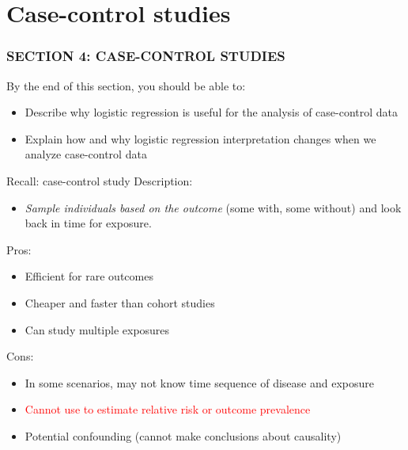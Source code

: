 \documentclass[10pt,t]{beamer}
\begin{document}
\section{Case-control studies}
\begin{frame}
	\frametitle{SECTION 4: CASE-CONTROL STUDIES}
	By the end of this section, you should be able to:
	\begin{itemize}
		\item Describe why logistic regression is useful for the analysis of case-control data
		\item Explain how and why logistic regression interpretation changes when we analyze case-control data
	\end{itemize}
\end{frame}

\begin{frame}{Recall: case-control study}
	Description:
	\begin{itemize}
		\item \textit{Sample individuals based on the outcome} (some with, some without) and look back in time for exposure. 
	\end{itemize}\pause
	Pros:\pause
	\begin{itemize}
		\item Efficient for rare outcomes\pause
		\item Cheaper and faster than cohort studies\pause
		\item Can study multiple exposures\pause
	\end{itemize}
	
	Cons:\pause
	\begin{itemize}
		\item In some scenarios, may not know time sequence of disease and exposure\pause
		\item \textcolor{red}{Cannot use to estimate relative risk or outcome prevalence}\pause
		\item Potential confounding (cannot make conclusions about causality)\pause
	\end{itemize}
\end{frame}
\end{document}
